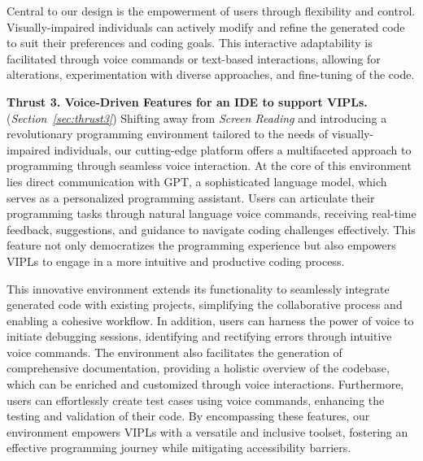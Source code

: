 Central to our design is the empowerment of users through flexibility
and control. Visually-impaired individuals can actively modify and
refine the generated code to suit their preferences and coding
goals. This interactive adaptability is facilitated through voice
commands or text-based interactions, allowing for alterations,
experimentation with diverse approaches, and fine-tuning of the
code.

\vspace{3pt}
\noindent \textbf{Thrust 3. Voice-Driven Features for an IDE to
  support VIPLs.} ({\em Section~\ref{sec:thrust3}}) Shifting away from
          {\em Screen Reading} and introducing a revolutionary
          programming environment tailored to the needs of
          visually-impaired individuals, our cutting-edge platform
          offers a multifaceted approach to programming through
          seamless voice interaction. At the core of this environment
          lies direct communication with GPT, a sophisticated language
          model, which serves as a personalized programming
          assistant. Users can articulate their programming tasks
          through natural language voice commands, receiving real-time
          feedback, suggestions, and guidance to navigate coding
          challenges effectively. This feature not only democratizes
          the programming experience but also empowers VIPLs to engage
          in a more intuitive and productive coding process.

This innovative environment extends its functionality to seamlessly
integrate generated code with existing projects, simplifying the
collaborative process and enabling a cohesive workflow. In addition,
users can harness the power of voice to initiate debugging sessions,
identifying and rectifying errors through intuitive voice
commands. The environment also facilitates the generation of
comprehensive documentation, providing a holistic overview of the
codebase, which can be enriched and customized through voice
interactions. Furthermore, users can effortlessly create test cases
using voice commands, enhancing the testing and validation of their
code. By encompassing these features, our environment
empowers VIPLs with a versatile and inclusive
toolset, fostering an effective programming journey while mitigating
accessibility barriers.

